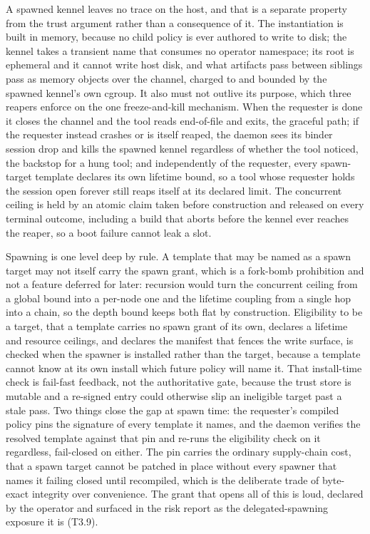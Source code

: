 A spawned kennel leaves no trace on the host, and that is a separate
property from the trust argument rather than a consequence of it. The
instantiation is built in memory, because no child policy is ever
authored to write to disk; the kennel takes a transient name that
consumes no operator namespace; its root is ephemeral and it cannot
write host disk, and what artifacts pass between siblings pass as memory
objects over the channel, charged to and bounded by the spawned kennel's
own cgroup. It also must not outlive its purpose, which three reapers
enforce on the one freeze-and-kill mechanism. When the requester is done
it closes the channel and the tool reads end-of-file and exits, the
graceful path; if the requester instead crashes or is itself reaped, the
daemon sees its binder session drop and kills the spawned kennel
regardless of whether the tool noticed, the backstop for a hung tool;
and independently of the requester, every spawn-target template declares
its own lifetime bound, so a tool whose requester holds the session open
forever still reaps itself at its declared limit. The concurrent ceiling
is held by an atomic claim taken before construction and released on
every terminal outcome, including a build that aborts before the kennel
ever reaches the reaper, so a boot failure cannot leak a slot.

Spawning is one level deep by rule. A template that may be named as a
spawn target may not itself carry the spawn grant, which is a fork-bomb
prohibition and not a feature deferred for later: recursion would turn
the concurrent ceiling from a global bound into a per-node one and the
lifetime coupling from a single hop into a chain, so the depth bound
keeps both flat by construction. Eligibility to be a target, that a
template carries no spawn grant of its own, declares a lifetime and
resource ceilings, and declares the manifest that fences the write
surface, is checked when the spawner is installed rather than the
target, because a template cannot know at its own install which future
policy will name it. That install-time check is fail-fast feedback, not
the authoritative gate, because the trust store is mutable and a
re-signed entry could otherwise slip an ineligible target past a stale
pass. Two things close the gap at spawn time: the requester's compiled
policy pins the signature of every template it names, and the daemon
verifies the resolved template against that pin and re-runs the
eligibility check on it regardless, fail-closed on either. The pin
carries the ordinary supply-chain cost, that a spawn target cannot be
patched in place without every spawner that names it failing closed
until recompiled, which is the deliberate trade of byte-exact integrity
over convenience. The grant that opens all of this is loud, declared by
the operator and surfaced in the risk report as the delegated-spawning
exposure it is (T3.9).
